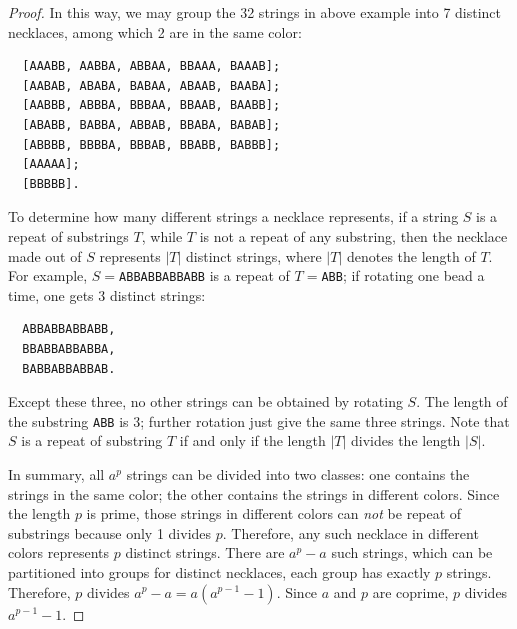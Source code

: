 \begin{proof}
In this way, we may group the 32 strings in above example into 7 distinct necklaces, among which 2 are in the same color:

\begin{verbatim}
  [AAABB, AABBA, ABBAA, BBAAA, BAAAB];
  [AABAB, ABABA, BABAA, ABAAB, BAABA];
  [AABBB, ABBBA, BBBAA, BBAAB, BAABB];
  [ABABB, BABBA, ABBAB, BBABA, BABAB];
  [ABBBB, BBBBA, BBBAB, BBABB, BABBB];
  [AAAAA];
  [BBBBB].
\end{verbatim}

To determine how many different strings a necklace represents, if a string $S$ is a repeat of substrings $T$, while $T$ is not a repeat of any substring, then the necklace made out of $S$ represents $|T|$ distinct strings, where $|T|$ denotes the length of $T$. For example, $S=$\texttt{ABBABBABBABB} is a repeat of $T=$\texttt{ABB}; if rotating one bead a time, one gets 3 distinct strings:

\begin{verbatim}
  ABBABBABBABB,
  BBABBABBABBA,
  BABBABBABBAB.
\end{verbatim}

Except these three, no other strings can be obtained by rotating $S$. The length of the substring \texttt{ABB} is 3; further rotation just give the same three strings. Note that $S$ is a repeat of substring $T$ if and only if the length $|T|$ divides the length $|S|$.

In summary, all $a^p$ strings can be divided into two classes: one contains the strings in the same color; the other contains the strings in different colors. Since the length $p$ is prime, those strings in different colors can \emph{not} be repeat of substrings because only 1 divides $p$. Therefore, any such necklace in different colors represents $p$ distinct strings. There are $a^p - a$ such strings, which can be partitioned into groups for distinct necklaces, each group has exactly $p$ strings. Therefore, $p$ divides $a^p - a = a(a^{p-1} - 1)$. Since $a$ and $p$ are coprime, $p$ divides $a^{p-1} - 1$.
\end{proof}
